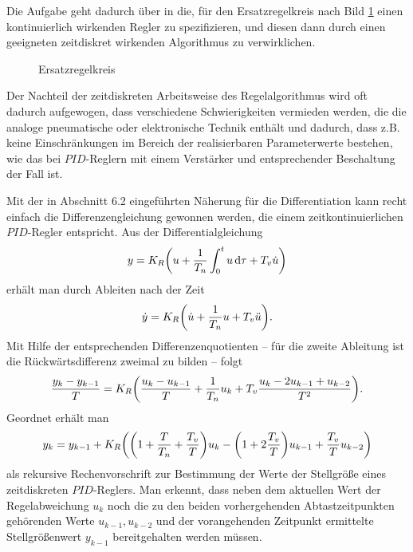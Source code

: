 Die Aufgabe geht dadurch über in die, für den Ersatzregelkreis nach Bild \ref{fig:6-12} einen kontinuierlich wirkenden Regler zu spezifizieren, und diesen dann durch einen geeigneten zeitdiskret wirkenden Algorithmus zu verwirklichen.
\begin{figure}[ht]
	\centering
	\caption{Ersatzregelkreis}
	\label{fig:6-12}
\end{figure}
Der Nachteil der zeitdiskreten Arbeitsweise des Regelalgorithmus wird oft dadurch aufgewogen, dass verschiedene Schwierigkeiten vermieden werden, die die analoge pneumatische oder elektronische Technik enthält und dadurch, dass z.B. keine Einschränkungen im Bereich der realisierbaren Parameterwerte bestehen, wie das bei \(PID\)-Reglern mit einem Verstärker und entsprechender Beschaltung der Fall ist.

Mit der in Abschnitt 6.2 eingeführten Näherung für die Differentiation kann recht einfach die Differenzengleichung gewonnen werden, die einem zeitkontinuierlichen \(PID\)-Regler entspricht.
Aus der Differentialgleichung
\begin{equation}
	y = K_R \parentheses*{u + \frac{1}{T_n}\int_0^t u\d\tau + T_v \dot{u}}
\end{equation}
erhält man durch Ableiten nach der Zeit
\begin{equation}
	\dot{y} = K_R \parentheses*{\dot{u} + \frac{1}{T_n}u + T_v \ddot{u}}.
\end{equation}
Mit Hilfe der entsprechenden Differenzenquotienten -- für die zweite Ableitung ist die Rückwärtsdifferenz zweimal zu bilden -- folgt
\begin{equation}
	\frac{y_k - y_{k - 1}}{T} = K_R \parentheses*{\frac{u_k - u_{k - 1}}{T} + \frac{1}{T_n}u_k + T_v \frac{u_k - 2u_{k - 1} + u_{k - 2}}{T^2}}.
\end{equation}
Geordnet erhält man
\begin{equation}\label{eq:6-38}
	y_k = y_{k - 1} + K_R \parentheses*{\parentheses*{1 + \frac{T}{T_n} + \frac{T_v}{T}}u_k - \parentheses*{1 + 2\frac{T_v}{T}}u_{k - 1} + \frac{T_v}{T}u_{k - 2}}
\end{equation}
als rekursive Rechenvorschrift zur Bestimmung der Werte der Stellgröße eines zeitdiskreten \(PID\)-Reglers.
Man erkennt, dass neben dem aktuellen Wert der Regelabweichung \(u_k\) noch die zu den beiden vorhergehenden Abtastzeitpunkten gehörenden Werte \(u_{k - 1}, u_{k - 2}\) und der vorangehenden Zeitpunkt ermittelte Stellgrößenwert \(y_{k - 1}\) bereitgehalten werden müssen.

